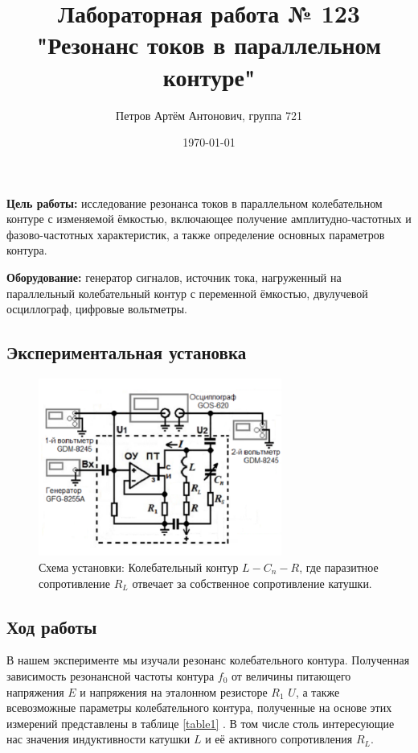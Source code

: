 \documentclass[a4paper,12pt]{article}
\author{Петров Артём Антонович, группа 721}
\title{Лабораторная работа № 123 "Резонанс токов в параллельном контуре"}
\date{\today}
\begin{document}

\begin{minipage}[t][7cm]{\textwidth}
\maketitle
\end{minipage}


\textbf{Цель работы:} исследование резонанса токов в параллельном колебательном контуре с изменяемой ёмкостью, включающее получение амплитудно-частотных и фазово-частотных характеристик, а также
определение основных параметров контура.
\bigskip

\medskip
\textbf{Оборудование:} генератор сигналов, источник тока, нагруженный на параллельный колебательный
контур с переменной ёмкостью, двулучевой осциллограф, цифровые вольтметры.

\bigskip


\subsection*{Экспериментальная установка}
\bigskip


\begin{figure}[ht]
\centering
\includegraphics[width=80mm]{scheme.png}
\caption{Схема установки: Колебательный контур $L-C_n-R$, где паразитное сопротивление $R_L$ отвечает за собственное сопротивление катушки. }\label{schema}
\end{figure}

\bigskip

\subsection*{Ход работы}
\bigskip

В нашем эксперименте мы изучали резонанс колебательного контура. Полученная зависимость резонансной частоты контура $f_0$ от величины питающего напряжения $E$ и напряжения на эталонном резисторе $R_1$ $U$, а также всевозможные параметры колебательного контура, полученные на основе этих измерений представлены в таблице \ref{table1} . В том числе столь интересующие нас значения индуктивности катушки $L$ и её активного сопротивления $R_L$.
\end{document}
